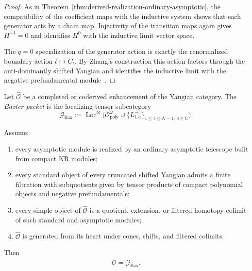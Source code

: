 \begin{proof}
As in Theorem~\ref{thm:derived-realization-ordinary-asymptotic}, the
compatibility of the coefficient maps with the inductive system shows that
each generator acts by a chain map.  Injectivity of the transition maps
again gives $H^{-1}=0$ and identifies $H^0$ with the inductive limit
vector space.

The $q=0$ specialization of the generator action is exactly the renormalized
boundary action $t\mapsto C_t$.  By Zhang's construction this action
factors through the anti-dominantly shifted Yangian and identifies the
inductive limit with the negative prefundamental module~\cite{Zhang24}.
\end{proof}

\begin{definition}
\label{def:baxter-packet}
Let $\widehat{\mathcal O}$ be a completed or coderived enhancement of the
Yangian category.  The \emph{Baxter packet} is the localizing tensor
subcategory
\begin{equation}
\mathcal G_{\mathrm{Bax}}
:=
\operatorname{Loc}^{\otimes}
\Big(
\mathcal O^{\omega}_{\mathrm{poly}}
\cup
\{L^-_{i,a}\}_{1\le i\le N-1,\,a\in\mathbb C}
\Big).
\end{equation}
\end{definition}

\begin{theorem}
\ClaimStatusProvedHere
\label{thm:baxter-envelope-criterion}
Assume:
\begin{enumerate}
    \item every asymptotic module is realized by an ordinary asymptotic
    telescope built from compact KR modules;
    \item every standard object of every truncated shifted Yangian admits
    a finite filtration with subquotients given by tensor products of
    compact polynomial objects and negative prefundamentals;
    \item every simple object of $\widehat{\mathcal O}$ is a quotient,
    extension, or filtered homotopy colimit of such standard and
    asymptotic modules;
    \item $\widehat{\mathcal O}$ is generated from its heart under cones,
    shifts, and filtered colimits.
\end{enumerate}
Then
\begin{equation}
\widehat{\mathcal O}=\mathcal G_{\mathrm{Bax}}.
\end{equation}
\end{theorem}


